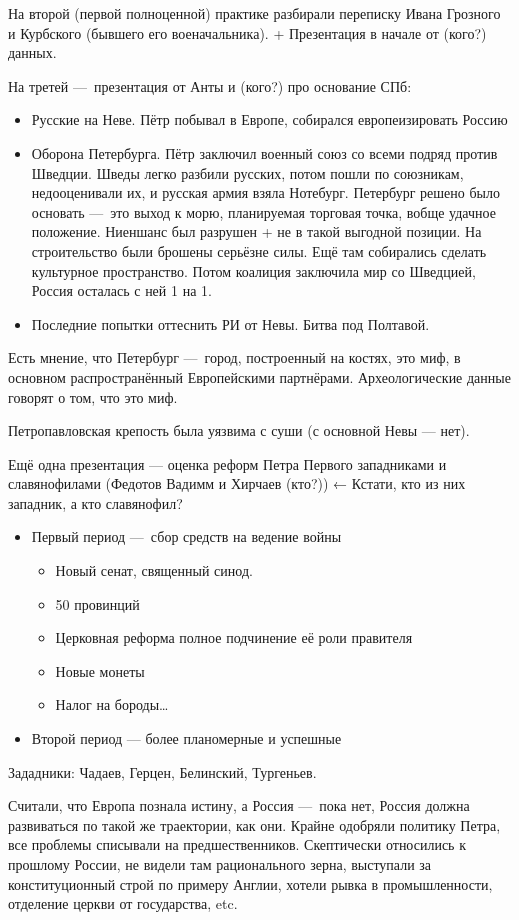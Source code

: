 \documentclass[12pt, a4paper]{article}
\begin{document}
    На второй (первой полноценной) практике разбирали переписку Ивана Грозного и Курбского (бывшего его военачальника).
    + Презентация в начале от (кого?) данных.

    На третей — презентация от Анты и (кого?) про основание СПб:
    
    \begin{itemize}
        \item Русские на Неве. Пётр побывал в Европе, собирался европеизировать Россию
        \item Оборона Петербурга. Пётр заключил военный союз со всеми подряд против Шведции. 
        Шведы легко разбили русских, потом пошли по союзникам, недооценивали их, и русская армия взяла Нотебург.
        Петербург решено было основать — это выход к морю, планируемая торговая точка, вобще удачное положение. Ниеншанс был разрушен + не в такой выгодной позиции. 
        На строительство были брошены серьёзне силы. Ещё там собирались сделать культурное пространство.
        Потом коалиция заключила мир со Шведцией, Россия осталась с ней 1 на 1.
        \item Последние попытки оттеснить РИ от Невы. Битва под Полтавой.
    \end{itemize}

    Есть мнение, что Петербург — город, построенный на костях, это миф, 
    в основном распространённый Европейскими партнёрами. 
    Археологические данные говорят о том, что это миф.

    Петропавловская крепость была уязвима с суши (с основной Невы — нет).

    \ornamentbreak

    Ещё одна презентация — оценка реформ Петра Первого западниками и славянофилами (Федотов Вадимм и Хирчаев (кто?)) ← Кстати, кто из них западник, а кто славянофил?

    \begin{itemize}
        \item Первый период — сбор средств на ведение войны
        \begin{itemize}
            \item Новый сенат, священный синод.
            \item 50 провинций
            \item Церковная реформа полное подчинение её роли правителя
            \item Новые монеты
            \item Налог на бороды…
        \end{itemize}
        \item Второй период — более планомерные и успешные
    \end{itemize}


    Зададники: Чадаев, Герцен, Белинский, Тургеньев.

    Считали, что Европа познала истину, а Россия — пока нет, Россия должна развиваться по такой же траектории, как они.
    Крайне одобряли политику Петра, все проблемы списывали на предшественников.
    Скептически относились к прошлому России, не видели там рационального зерна, выступали за конституционный строй по примеру Англии,
    хотели рывка в промышленности, отделение церкви от государства, etc.
\end{document}

